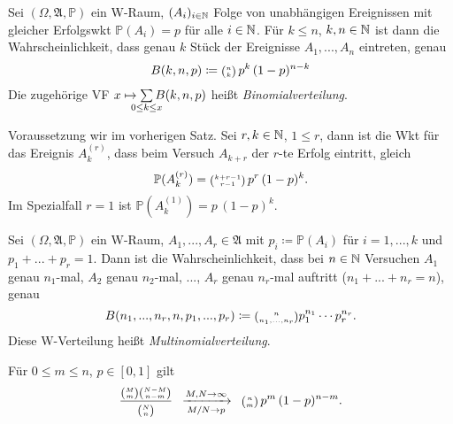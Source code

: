 \documentclass{cheat-sheet}
\newcommand{\Alg}{\mathfrak{A}} %
\renewcommand{\P}{\mathbb{P}} %
\let\myBinom\binom
\renewcommand{\binom}[2]{\mathsmaller{\myBinom{#1}{#2}}}
\begin{document}




\begin{satz}
  Sei $(\Omega, \Alg, \P)$ ein W-Raum, $(A_i)_{i \in \mathbb{N}}$ Folge von unabhängigen Ereignissen mit gleicher Erfolgswkt $\P(A_i) = p$ für alle $i \in \mathbb{N}$. Für $k \leq n$, $k, n \in \mathbb{N}$ ist dann die Wahrscheinlichkeit, dass genau $k$ Stück der Ereignisse $A_1, ..., A_n$ eintreten, genau
  \[ B(k, n, p) \coloneqq \binom{n}{k} \, p^k \, (1-p)^{n-k} \]
  Die zugehörige VF $x \mapsto \sum_{\mathclap{0 \leq k \leq x}} B(k,n,p)$ heißt \emph{Binomialverteilung}.
\end{satz}


\begin{lem}
  Voraussetzung wir im vorherigen Satz. Sei $r, k \in \mathbb{N}$, $1 \leq r$, dann ist die Wkt für das Ereignis $A_k^{(r)}$, dass beim Versuch $A_{k+r}$ der $r$-te Erfolg eintritt, gleich
  \[ \P(A_k^{(r)}) = \binom{k+r-1}{r-1} \, p^r \, (1-p)^k. \]
  Im Spezialfall $r = 1$ ist $\P(A_k^{(1)}) = p \, (1-p)^k$.
\end{lem}

\begin{satz}
  Sei $(\Omega, \Alg, \P)$ ein W-Raum, $A_1, ..., A_r \in \Alg$ mit $p_i \coloneqq \P(A_i)$ für $i = 1, ..., k$ und $p_1 + ... + p_r = 1$. Dann ist die Wahrscheinlichkeit, dass bei $n \in \mathbb{N}$ Versuchen $A_1$ genau $n_1$-mal, $A_2$ genau $n_2$-mal, ..., $A_r$ genau $n_r$-mal auftritt ($n_1 + ... + n_r = n$), genau
  \[ B(n_1, ..., n_r, n, p_1, ..., p_r) \coloneqq \binom{n}{n_1, ..., n_r} p_1^{n_1} \cdots p_r^{n_r}. \]
  Diese W-Verteilung heißt \emph{Multinomialverteilung}.
\end{satz}


\begin{satz}
  Für $0 \leq m \leq n$, $p \in [0, 1]$ gilt
  \[ \frac{\binom{M}{m} \binom{N-M}{n-m}}{\binom{N}{n}} \enspace \xrightarrow[M/N \to p]{M, N \to \infty} \enspace \binom{n}{m} \, p^m \, (1-p)^{n-m}. \]
\end{satz}

\end{document}

